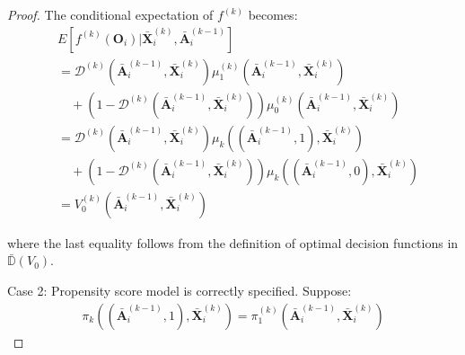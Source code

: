 \documentclass[11pt]{article}
\theoremstyle{referenceplain}
\theoremstyle{referencedefinition}
\theoremstyle{referenceremark}
\begin{document}
\begin{proof}
The conditional expectation of $f^{(k)}$ becomes:
\begin{align*}
    &E[f^{(k)}(\mathbf{O}_i)|\bar{\mathbf{X}}_i^{(k)}, \bar{\mathbf{A}}_i^{(k-1)}]\\
    &= \mathcal{D}^{(k)}(\bar{\mathbf{A}}_i^{(k-1)}, \bar{\mathbf{X}}_i^{(k)}) \mu_1^{(k)}(\bar{\mathbf{A}}_i^{(k-1)}, \bar{\mathbf{X}}_i^{(k)})\\
    &\quad + (1-\mathcal{D}^{(k)}(\bar{\mathbf{A}}_i^{(k-1)}, \bar{\mathbf{X}}_i^{(k)})) \mu_0^{(k)}(\bar{\mathbf{A}}_i^{(k-1)}, \bar{\mathbf{X}}_i^{(k)})\\
    &= \mathcal{D}^{(k)}(\bar{\mathbf{A}}_i^{(k-1)}, \bar{\mathbf{X}}_i^{(k)}) \mu_k((\bar{\mathbf{A}}_i^{(k-1)}, 1), \bar{\mathbf{X}}_i^{(k)})\\
    &\quad + (1-\mathcal{D}^{(k)}(\bar{\mathbf{A}}_i^{(k-1)}, \bar{\mathbf{X}}_i^{(k)})) \mu_k((\bar{\mathbf{A}}_i^{(k-1)}, 0), \bar{\mathbf{X}}_i^{(k)})\\
    &= V_0^{(k)}(\bar{\mathbf{A}}_i^{(k-1)}, \bar{\mathbf{X}}_i^{(k)})
\end{align*}

where the last equality follows from the definition of optimal decision functions in $\bar{\mathbb{D}}(V_0)$.

Case 2: Propensity score model is correctly specified. Suppose:
\begin{align*}
    \pi_k((\bar{\mathbf{A}}_i^{(k-1)}, 1), \bar{\mathbf{X}}_i^{(k)}) = \pi_1^{(k)}(\bar{\mathbf{A}}_i^{(k-1)}, \bar{\mathbf{X}}_i^{(k)})
\end{align*}


\end{proof}
\end{document}
